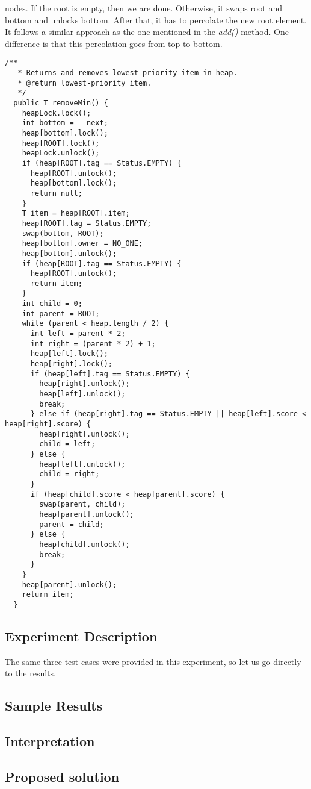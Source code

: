 nodes. If the root is empty, then we are done. Otherwise, it swaps root and
bottom and unlocks bottom. After that, it has to percolate the new root
element. It follows a similar approach as the one mentioned in the
\textit{add()} method. One difference is that this percolation goes from top to
bottom.
\par
\hfill
\begin{lstlisting}[style=numbers]
  /**
   * Returns and removes lowest-priority item in heap.
   * @return lowest-priority item.
   */
  public T removeMin() {
    heapLock.lock();
    int bottom = --next;
    heap[bottom].lock();
    heap[ROOT].lock();
    heapLock.unlock();
    if (heap[ROOT].tag == Status.EMPTY) {
      heap[ROOT].unlock();
      heap[bottom].lock();
      return null;
    }
    T item = heap[ROOT].item;
    heap[ROOT].tag = Status.EMPTY;
    swap(bottom, ROOT);
    heap[bottom].owner = NO_ONE;
    heap[bottom].unlock();
    if (heap[ROOT].tag == Status.EMPTY) {
      heap[ROOT].unlock();
      return item;
    }
    int child = 0;
    int parent = ROOT;
    while (parent < heap.length / 2) {
      int left = parent * 2;
      int right = (parent * 2) + 1;
      heap[left].lock();
      heap[right].lock();
      if (heap[left].tag == Status.EMPTY) {
        heap[right].unlock();
        heap[left].unlock();
        break;
      } else if (heap[right].tag == Status.EMPTY || heap[left].score < heap[right].score) {
        heap[right].unlock();
        child = left;
      } else {
        heap[left].unlock();
        child = right;
      }
      if (heap[child].score < heap[parent].score) {
        swap(parent, child);
        heap[parent].unlock();
        parent = child;
      } else {
        heap[child].unlock();
        break;
      }
    }
    heap[parent].unlock();
    return item;
  }
\end{lstlisting}
\hfill
\par
\subsection{Experiment Description}
\par
The same three test cases were provided in this experiment, so let us go
directly to the results.
\par
\subsection{Sample Results}
\par
\par
\subsection{Interpretation}
\par
\par
\subsection{Proposed solution}
\par
\par
